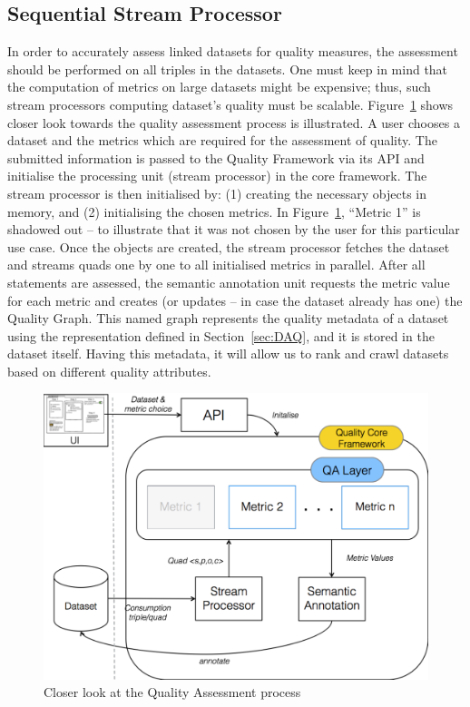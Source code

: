 
\subsection{Sequential Stream Processor}
\label{sec:StreamProcessor} 
In order to accurately assess linked datasets for quality measures, the assessment should be performed on all triples in the datasets.
One must keep in mind that the computation of metrics on large datasets might be expensive; thus, such stream processors computing dataset's quality must be scalable.
Figure~\ref{fig:closerLook} shows closer look towards the quality assessment process is illustrated.
A user chooses a dataset and the metrics which are required for the assessment of quality.
The submitted information is passed to the Quality Framework via its API and initialise the processing unit (stream processor) in the core framework.
The stream processor is then initialised by: (1) creating the necessary objects in memory, and (2) initialising the chosen metrics. 
In Figure~\ref{fig:closerLook}, ``Metric 1'' is shadowed out – to illustrate that it was not chosen by the user for this particular use case.
Once the objects are created, the stream processor fetches the dataset and streams quads one by one to all initialised metrics in parallel.
After all statements are assessed, the semantic annotation unit requests the metric value for each metric and creates (or updates – in case the dataset already has one) the Quality Graph.
This named graph represents the quality metadata of a dataset using the representation defined in Section~\ref{sec:DAQ}, and it is stored in the dataset itself.
Having this metadata, it will allow us to rank and crawl datasets based on different quality attributes.

\begin{figure}[tbph]
\center
\includegraphics[scale=0.3]{images/closerLook.pdf} 
\caption{Closer look at the Quality Assessment process} 
\label{fig:closerLook}
\end{figure}

